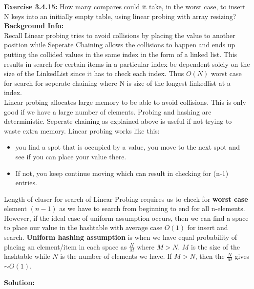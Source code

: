 \documentclass[11pt,fleqn]{article}
\begin{document}
\textbf{Exercise 3.4.15:} How many compares could it take, in the worst case, to insert N keys into an
initially empty table, using linear probing with array resizing?\\

\textbf{Background Info:}\\ Recall Linear probing tries to avoid collisions by placing the value to another position while Seperate Chaining allows the collisions to happen and ends up putting the collided values in the same index in the form of a linked list. This results in search for certain items in a particular index be dependent solely on the size of the LinkedList since it has to check each index. Thus $O(N)$ worst case for search for seperate chaining where N is size of the longest linkedlist at a index.\\

Linear probing allocates large memory to be able to avoid collisions. This is only good if we have a large number of elements. Probing and hashing are deterministic. Seperate chaining as explained above is useful if not trying to waste extra memory. Linear probing works like this: 

\begin{itemize}
 \item you find a spot that is occupied by a value, you move to the next spot and see if you can place your value there.
 
 \item If not, you keep continue moving which can result in checking for (n-1) entries.
 
\end{itemize}   

Length of cluser for search of Linear Probing requires us to check for \textbf{worst case} element $(n-1)$ as we have to search from beginning to end for all n-elements. \\

However, if the ideal case of uniform assumption occurs, then we can find a space to place our value in the hashtable with average case $O(1)$ for insert and search. \textbf{Uniform hashing assumption} is when we have equal probability of placing an element/item in each space as $\frac{N}{M}$ where $M>N$. $M$ is the size of the hashtable while $N$ is the number of elements we have. If $M>N$, then the $\frac{N}{M}$ gives $\sim O(1)$.

\newpage

\textbf{Solution:}\\
\end{document}
